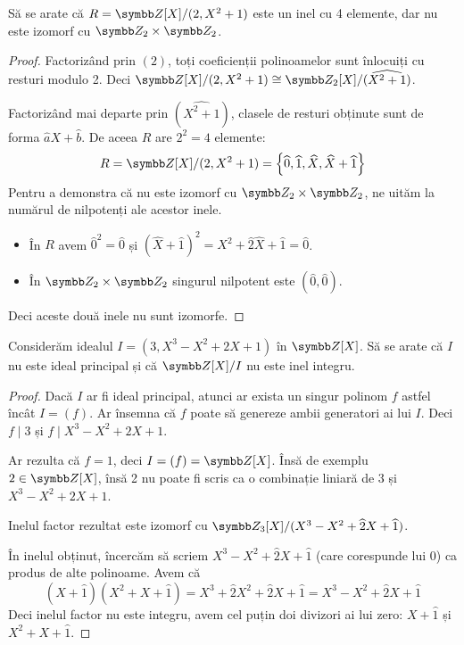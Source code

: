 \begin{exercise}[2.6]
Să se arate că \(R = \integers[X] / (2, X^2 + 1)\) este un inel cu 4 elemente, dar nu este izomorf cu \(\integersmod{2} \times \integersmod{2}\).
\end{exercise}
\begin{proof}
Factorizând prin \((2)\), toți coeficienții polinoamelor sunt înlocuiți cu resturi modulo 2. Deci \(\integers[X] / (2, X^2 + 1) \cong \integersmod{2}[X] / (\widehat{X^2 + 1})\).

Factorizând mai departe prin \((\widehat{X^2 + 1})\), clasele de resturi obținute sunt de forma \(\widehat{a}X + \widehat{b}\). De aceea \(R\) are \(2^2 = 4\) elemente:\
\[
    R = \integers[X] / (2, X^2 + 1) = \left\lbrace \widehat{0}, \widehat{1}, \widehat{X}, \widehat{X} + \widehat{1} \right\rbrace
\]
Pentru a demonstra că nu este izomorf cu \(\integersmod{2} \times \integersmod{2}\), ne uităm la numărul de nilpotenți ale acestor inele.
\begin{itemize}
    \item În \(R\) avem \(\widehat{0}^2 = \widehat{0}\) și \((\widehat{X} + \widehat{1})^2 = \widehat{X^2} + \widehat{2} \widehat{X} + \widehat{1} = \widehat{0}\).
    \item În \(\integersmod{2} \times \integersmod{2}\) singurul nilpotent este \((\widehat{0}, \widehat{0})\).
\end{itemize}
Deci aceste două inele nu sunt izomorfe.
\end{proof}

\begin{exercise}[2.7]
Considerăm idealul \(I = (3, X^3 - X^2 + 2X + 1)\) în \(\integers[X]\). Să se arate că \(I\) nu este ideal principal și că \(\integers[X] / I\) nu este inel integru.
\end{exercise}
\begin{proof}
Dacă \(I\) ar fi ideal principal, atunci ar exista un singur polinom \(f\) astfel încât \(I = (f)\). Ar însemna că \(f\) poate să genereze ambii generatori ai lui \(I\). Deci \(f \mid 3\) și \(f \mid X^3 - X^2 + 2X + 1\).

Ar rezulta că \(f = 1\), deci \(I = (f) = \integers[X]\). Însă de exemplu \(2 \in \integers[X]\), însă 2 nu poate fi scris ca o combinație liniară de \(3\) și \(X^3 - X^2 + 2X + 1\).

Inelul factor rezultat este izomorf cu \(\integersmod{3}[X] / (X^3 - X^2 + \widehat{2} X + \widehat{1})\).

În inelul obținut, încercăm să scriem \(X^3 - X^2 + \widehat{2} X + \widehat{1}\) (care corespunde lui 0) ca produs de alte polinoame. Avem că
\[
    (X + \widehat{1})(X^2 + X + \widehat{1}) = X^3 + \widehat{2} X^2 + \widehat{2} X + \widehat{1} = X^3 - X^2 + \widehat{2} X + \widehat{1}
\]
Deci inelul factor nu este integru, avem cel puțin doi divizori ai lui zero: \(X + \widehat{1}\) și \(X^2 + X + \widehat{1}\).
\end{proof}

